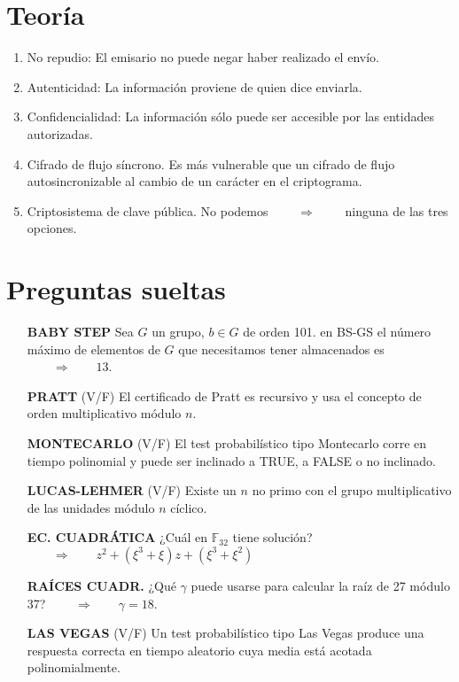 \documentclass[fleqn]{article}
\def\F{\mathds{F}}
\def\next{\qquad \Rightarrow \qquad}
\begin{document}
    \section{Teoría}
    \begin{enumerate}
        \item No repudio: El emisario no puede negar haber realizado el envío.
        \item Autenticidad: La información proviene de quien dice enviarla.
        \item Confidencialidad: La información sólo puede ser accesible por las entidades autorizadas.
        \item Cifrado de flujo síncrono. Es más vulnerable que un cifrado de flujo autosincronizable al cambio de un carácter en el criptograma.
        \item Criptosistema de clave pública. No podemos $\next$ ninguna de las tres opciones.
    \end{enumerate}

    \section{Preguntas sueltas}
    \begin{itemize}
        \item[\textbf{BABY STEP}] Sea $G$ un grupo, $b \in G$ de orden 101. en BS-GS el número máximo de elementos de $G$ que necesitamos tener almacenados es $\next 13$.
        \item[\textbf{PRATT}]  (V/F) El certificado de Pratt es recursivo y usa el concepto de orden multiplicativo módulo $n$.
        \item[\textbf{MONTECARLO}] (V/F) El test probabilístico tipo Montecarlo corre en tiempo polinomial y puede ser inclinado a TRUE, a FALSE o no inclinado.
        \item[\textbf{LUCAS-LEHMER}] (V/F) Existe un $n$ no primo con el grupo multiplicativo de las unidades módulo $n$ cíclico.
        \item[\textbf{EC. CUADRÁTICA}] ¿Cuál en $\F_{32}$ tiene solución? $\next z^2 + (\xi^3 + \xi)z + (\xi^3 + \xi^2)$ 
        \item[\textbf{RAÍCES CUADR.}] ¿Qué $\gamma$ puede usarse para calcular la raíz de 27 módulo 37? $\next \gamma = 18$. 
        \item[\textbf{LAS VEGAS}] (V/F) Un test probabilístico tipo Las Vegas produce una respuesta correcta en tiempo aleatorio cuya media está acotada polinomialmente.
    \end{itemize}
\end{document}
